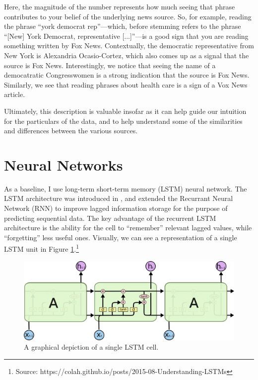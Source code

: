 \documentclass{article}
\begin{document}
		Here, the magnitude of the number represents how much seeing that phrase contributes to your belief of the underlying news source. So, for example, reading the phrase ``york democrat rep''---which, before stemming refers to the phrase ``[New] York Democrat, representative [...]''---is a good sign that you are reading something written by Fox News. Contextually, the democratic representative from New York is Alexandria Ocasio-Cortez, which also comes up as a signal that the source is Fox News. Interestingly, we notice that seeing the name of a democatratic Congresswomen is a  strong indication that the source is Fox News. Similarly, we see that reading phrases about health care is a sign of a Vox News article. 
		
		Ultimately, this description is valuable insofar as it can help guide our intuition for the particulars of the data, and to help understand some of the similarities and differences between the various sources. 
	
	    	
	\section{Neural Networks}
	As a baseline, I use long-term short-term memory (LSTM) neural network. The LSTM architecture was introduced in \citet{hochreiter1997long}, and extended the Recurrant Neural Network (RNN) to improve lagged information storage for the purpose of predicting sequential data. The key advantage of the recurrent LSTM architecture is the ability for the cell to ``remember'' relevant lagged values, while ``forgetting'' less useful ones. Visually, we can see a representation of a single LSTM unit in Figure \ref{fig:lstm}.\footnote{Source: https://colah.github.io/posts/2015-08-Understanding-LSTMs}
	
	\begin{figure}[H]
		\includegraphics[width=\textwidth]{figures/images/lstm-math.png}
		\caption{A graphical depiction of a single LSTM cell.}
		\label{fig:lstm}
	\end{figure}
\end{document}
